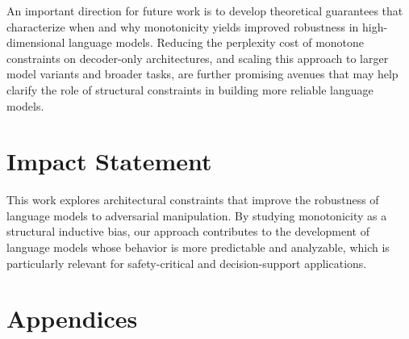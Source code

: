 \documentclass{article}
\theoremstyle{plain}
\theoremstyle{definition}
\theoremstyle{remark}
\begin{document}
An important direction for future work is to develop theoretical guarantees that characterize when and why monotonicity yields improved robustness in high-dimensional language models. Reducing the perplexity cost of monotone constraints on decoder-only architectures, and scaling this approach to larger model variants and broader tasks, are further promising avenues that may help clarify the role of structural constraints in building more reliable language models.
\section*{Impact Statement}

This work explores architectural constraints that improve the robustness of language models to adversarial manipulation. By studying monotonicity as a structural inductive bias, our approach contributes to the development of language models whose behavior is more predictable and analyzable, which is particularly relevant for safety-critical and decision-support applications.




\nocite{langley00}





\newpage
\appendix
\onecolumn
\section{Appendices}




\end{document}
